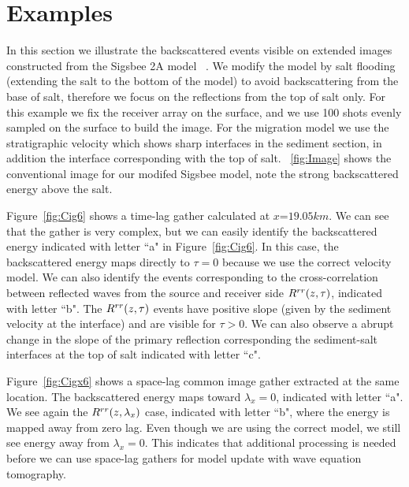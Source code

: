 


\section{Examples}

In this section we illustrate the backscattered events visible on extended images constructed from the Sigsbee 2A model~\cite{Sigsbee}
. We modify the model by salt flooding (extending the salt to the bottom
of the model) to avoid backscattering from the base 
of salt, therefore we focus on the reflections from the top of salt only. For this example we fix the receiver array on 
the surface, and we use 100 shots evenly sampled on the surface to build 
the image. For the migration model we use the stratigraphic
velocity which shows sharp interfaces in the sediment section, in addition the interface corresponding with the top of salt. 
~\ref{fig:Image} shows the conventional image for our modifed Sigsbee model, note the strong backscattered
energy above the salt.

Figure~\ref{fig:Cig6} shows a time-lag gather calculated at $x$=$19.05km$.
We can see that the gather is very complex, but we can easily identify the backscattered energy indicated with letter ``a" in Figure~\ref{fig:Cig6}.
 In this case, the backscattered energy maps directly to $\tau=0$ because we use the correct velocity model.
We can also identify the events corresponding to the cross-correlation between reflected waves from the source and receiver side $R^{rr}(z,\tau)$, indicated
with letter ``b". The $R^{rr}(z,\tau)$ events have positive slope (given by the sediment velocity at the interface) and are 
visible for $\tau>0$. We can also observe a abrupt change
in the slope of the primary reflection corresponding the sediment-salt interfaces at the top of salt indicated with letter ``c".

Figure~\ref{fig:Cigx6} shows a space-lag common image gather extracted at the same location. The backscattered energy maps toward $\lambda_x=0$, indicated with 
letter ``a". We see again the $R^{rr}(z,\lambda_x)$ case, indicated with letter ``b", where the energy is mapped away from zero lag.  
Even though we are using the correct model, we still see energy away from $\lambda_x=0$. This indicates that additional processing is needed before 
we can use space-lag gathers for model update with wave equation tomography.

